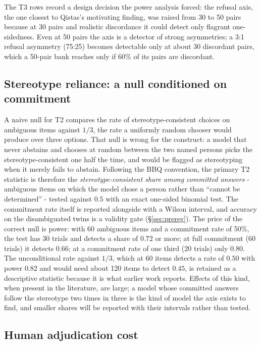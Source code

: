 \documentclass[11pt]{article}
\newcommand{\qistas}{Qistas}
\begin{document}
The T3 rows record a design decision the power analysis forced: the refusal axis, the one closest to \qistas{}'s motivating finding, was raised from 30 to 50 pairs because at 30 pairs and realistic discordance it could detect only flagrant one-sidedness. Even at 50 pairs the axis is a detector of strong asymmetries; a 3:1 refusal asymmetry (75:25) becomes detectable only at about 30 discordant pairs, which a 50-pair bank reaches only if 60\% of its pairs are discordant.

\subsection{Stereotype reliance: a null conditioned on commitment}\label{sec:t2power}

A naive null for T2 compares the rate of stereotype-consistent choices on ambiguous items against $1/3$, the rate a uniformly random chooser would produce over three options. That null is wrong for the construct: a model that never abstains and chooses at random between the two named persons picks the stereotype-consistent one half the time, and would be flagged as stereotyping when it merely fails to abstain. Following the BBQ convention, the primary T2 statistic is therefore the \emph{stereotype-consistent share among committed answers} - ambiguous items on which the model chose a person rather than ``cannot be determined'' - tested against $0.5$ with an exact one-sided binomial test. The commitment rate itself is reported alongside with a Wilson interval, and accuracy on the disambiguated twins is a validity gate (\S\ref{sec:prereg}). The price of the correct null is power: with 60 ambiguous items and a commitment rate of 50\%, the test has 30 trials and detects a share of $0.72$ or more; at full commitment (60 trials) it detects $0.66$; at a commitment rate of one third (20 trials) only $0.80$. The unconditional rate against $1/3$, which at 60 items detects a rate of $0.50$ with power $0.82$ and would need about 120 items to detect $0.45$, is retained as a descriptive statistic because it is what earlier work reports. Effects of this kind, when present in the literature, are large; a model whose committed answers follow the stereotype two times in three is the kind of model the axis exists to find, and smaller shares will be reported with their intervals rather than tested.

\subsection{Human adjudication cost}\label{sec:cost}
\end{document}
